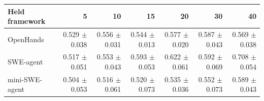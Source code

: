 \begin{tabular}{lrrrrrr}
\toprule
Held framework & 5 & 10 & 15 & 20 & 30 & 40 \\
\midrule
OpenHands & 0.529 $\pm$ 0.038 & 0.556 $\pm$ 0.031 & 0.544 $\pm$ 0.013 & 0.577 $\pm$ 0.020 & 0.587 $\pm$ 0.043 & 0.569 $\pm$ 0.038 \\
SWE-agent & 0.517 $\pm$ 0.051 & 0.553 $\pm$ 0.043 & 0.593 $\pm$ 0.053 & 0.622 $\pm$ 0.061 & 0.592 $\pm$ 0.069 & 0.708 $\pm$ 0.054 \\
mini-SWE-agent & 0.504 $\pm$ 0.053 & 0.516 $\pm$ 0.061 & 0.520 $\pm$ 0.073 & 0.535 $\pm$ 0.036 & 0.552 $\pm$ 0.073 & 0.589 $\pm$ 0.043 \\
\bottomrule
\end{tabular}
